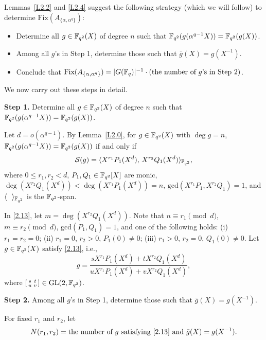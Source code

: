 \documentclass{amsart}
\numberwithin{equation}{section}
\theoremstyle{definition}
\newcommand{\f}{\Bbb F}
\begin{document}
Lemmas~\ref{L2.2} and \ref{L2.4} suggest the following strategy (which we will follow) to determine $\text{Fix}(A_{\{\alpha,\alpha^q\}})$:

\begin{itemize}
\item[Step 1.] Determine all $g\in\f_{q^2}(X)$ of degree $n$ such that $\f_{q^2}(g(\alpha^{q-1}X))=\f_{q^2}(g(X))$.

\item[Step 2.] Among all $g$'s in Step 1, determine those such that $\bar g(X)=g(X^{-1})$.

\item[Step 3.] Conclude that $\text{Fix}(A_{\{\alpha,\alpha^q\}})=|G(\f_q)|^{-1}\cdot(\text{the number of $g$'s in Step 2})$.
\end{itemize}    

We now carry out these steps in detail.

\medskip
{\bf Step 1.} Determine all $g\in\f_{q^2}(X)$ of degree $n$ such that $\f_{q^2}(g(\alpha^{q-1}X))=\f_{q^2}(g(X))$.

Let $d=o(\alpha^{q-1})$. By Lemma~\ref{L2.0}, for $g\in\f_{q^2}(X)$ with $\deg g=n$, $\f_{q^2}(g(\alpha^{q-1}X))=\f_{q^2}(g(X))$ if and only if 
\begin{equation}\label{2.13}
\mathcal S(g)=\langle X^{r_1}P_1(X^d),\,X^{r_2}Q_1(X^d)\rangle_{\f_{q^2}},
\end{equation}
where $0\le r_1,r_2<d$, $P_1,Q_1\in\f_{q^2}[X]$ are monic, $\deg(X^{r_2}Q_1(X^d))<\deg(X^{r_1}P_1(X^d))=n$, $\text{gcd}(X^{r_1}P_1,X^{r_2}Q_1)=1$, and $\langle\ \ \rangle_{\f_{q^2}}$ is the $\f_{q^2}$-span.

In \eqref{2.13}, let $m=\deg(X^{r_2}Q_1(X^d))$. Note that $n\equiv r_1\pmod d$, $m\equiv r_2\pmod d$, $\text{gcd}(P_1,Q_1)=1$, and one of the following holds: (i) $r_1=r_2=0$; (ii) $r_1=0$, $r_2>0$, $P_1(0)\ne 0$; (iii) $r_1>0$, $r_2=0$, $Q_1(0)\ne 0$. Let $g\in\f_{q^2}(X)$ satisfy \eqref{2.13}, i.e., 
\begin{equation}\label{2.14}
g=\frac{sX^{r_1}P_1(X^d)+tX^{r_2}Q_1(X^d)}{uX^{r_1}P_1(X^d)+vX^{r_2}Q_1(X^d)},
\end{equation}
where $\left[\begin{smallmatrix}s&t\cr u&v\end{smallmatrix}\right]\in\text{GL}(2,\f_{q^2})$.

\medskip
{\bf Step 2.} Among all $g$'s in Step 1, determine those such that $\bar g(X)=g(X^{-1})$.

For fixed $r_1$ and $r_2$, let
\[
N(r_1,r_2)=\text{the number of $g$ satisfying \eqref{2.13} and $\bar g(X)=g(X^{-1})$}.
\] 
\end{document}
